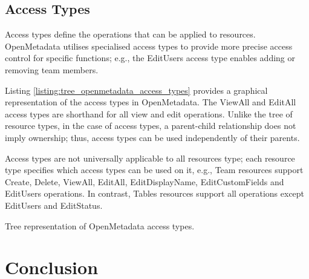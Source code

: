 \subsection{Access Types}

Access types define the operations that can be applied to resources. OpenMetadata utilises specialised access types to provide more precise access control for specific functions; e.g., the EditUsers access type enables adding or removing team members. 

Listing \ref{listing:tree_openmetadata_access_types} provides a graphical representation of the access types in OpenMetadata. The ViewAll and EditAll access types are shorthand for all view and edit operations. Unlike the tree of resource types, in the case of access types, a parent-child relationship does not imply ownership; thus, access types can be used independently of their parents.

Access types are not universally applicable to all resources type; each resource type specifies which access types can be used on it, e.g., Team resources support Create, Delete, ViewAll, EditAll, EditDisplayName, EditCustomFields and EditUsers operations. In contrast, Tables resources support all operations except EditUsers and EditStatus.

\begin{listing}

    \renewcommand\DTstyle{\rmfamily}

    \caption{Tree representation of OpenMetadata access types.}
    \label{listing:tree_openmetadata_access_types}
    
\end{listing}

\section{Conclusion}